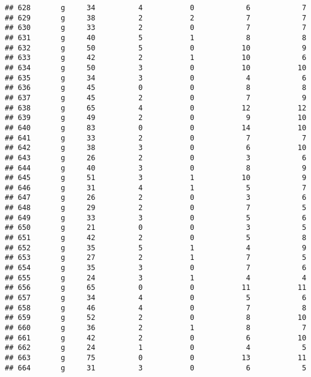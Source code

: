 \documentclass[
]{article}
\begin{document}
\begin{verbatim}
## 628       g     34          4           0            6            7
## 629       g     38          2           2            7            7
## 630       g     33          2           0            7            7
## 631       g     40          5           1            8            8
## 632       g     50          5           0           10            9
## 633       g     42          2           1           10            6
## 634       g     50          3           0           10           10
## 635       g     34          3           0            4            6
## 636       g     45          0           0            8            8
## 637       g     45          2           0            7            9
## 638       g     65          4           0           12           12
## 639       g     49          2           0            9           10
## 640       g     83          0           0           14           10
## 641       g     33          2           0            7            7
## 642       g     38          3           0            6           10
## 643       g     26          2           0            3            6
## 644       g     40          3           0            8            9
## 645       g     51          3           1           10            9
## 646       g     31          4           1            5            7
## 647       g     26          2           0            3            6
## 648       g     29          2           0            7            5
## 649       g     33          3           0            5            6
## 650       g     21          0           0            3            5
## 651       g     42          2           0            5            8
## 652       g     35          5           1            4            9
## 653       g     27          2           1            7            5
## 654       g     35          3           0            7            6
## 655       g     24          3           1            4            4
## 656       g     65          0           0           11           11
## 657       g     34          4           0            5            6
## 658       g     46          4           0            7            8
## 659       g     52          2           0            8           10
## 660       g     36          2           1            8            7
## 661       g     42          2           0            6           10
## 662       g     24          1           0            4            5
## 663       g     75          0           0           13           11
## 664       g     31          3           0            6            5

\end{verbatim}
\end{document}
